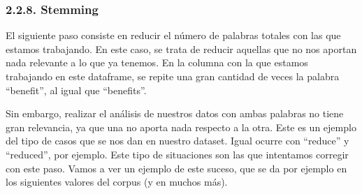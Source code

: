 \documentclass[spanish,]{article}
\newenvironment{Shaded}{\begin{snugshade}}{\end{snugshade}}
\newcommand{\KeywordTok}[1]{\textcolor[rgb]{0.13,0.29,0.53}{\textbf{#1}}}
\newcommand{\DataTypeTok}[1]{\textcolor[rgb]{0.13,0.29,0.53}{#1}}
\newcommand{\DecValTok}[1]{\textcolor[rgb]{0.00,0.00,0.81}{#1}}
\newcommand{\StringTok}[1]{\textcolor[rgb]{0.31,0.60,0.02}{#1}}
\newcommand{\CommentTok}[1]{\textcolor[rgb]{0.56,0.35,0.01}{\textit{#1}}}
\newcommand{\ControlFlowTok}[1]{\textcolor[rgb]{0.13,0.29,0.53}{\textbf{#1}}}
\newcommand{\OperatorTok}[1]{\textcolor[rgb]{0.81,0.36,0.00}{\textbf{#1}}}
\newcommand{\NormalTok}[1]{#1}
\begin{document}
\begin{Shaded}
\end{Shaded}

\subsubsection{2.2.8. Stemming}\label{stemming}

El siguiente paso consiste en reducir el número de palabras totales con
las que estamos trabajando. En este caso, se trata de reducir aquellas
que no nos aportan nada relevante a lo que ya tenemos. En la columna con
la que estamos trabajando en este dataframe, se repite una gran cantidad
de veces la palabra ``benefit'', al igual que ``benefits''.

Sin embargo, realizar el análisis de nuestros datos con ambas palabras
no tiene gran relevancia, ya que una no aporta nada respecto a la otra.
Este es un ejemplo del tipo de casos que se nos dan en nuestro dataset.
Igual ocurre con ``reduce'' y ``reduced'', por ejemplo. Este tipo de
situaciones son las que intentamos corregir con este paso. Vamos a ver
un ejemplo de este suceso, que se da por ejemplo en los siguientes
valores del corpus (y en muchos más).
\end{document}
